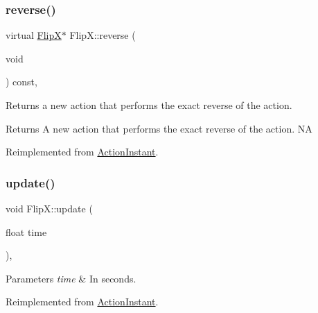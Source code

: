 \subsubsection{\texorpdfstring{reverse()}{reverse()}\hspace{0.1cm}{\footnotesize\ttfamily [2/2]}}
{\footnotesize\ttfamily virtual \hyperlink{classFlipX}{FlipX}$\ast$ Flip\+X\+::reverse (\begin{DoxyParamCaption}\item[{void}]{ }\end{DoxyParamCaption}) const\hspace{0.3cm}{\ttfamily [override]}, {\ttfamily [virtual]}}

Returns a new action that performs the exact reverse of the action.

\begin{DoxyReturn}{Returns}
A new action that performs the exact reverse of the action.  NA 
\end{DoxyReturn}


Reimplemented from \hyperlink{classActionInstant_aeb1870802c509e1f4111c863a28e9262}{Action\+Instant}.

\mbox{\label{classFlipX_ac83f96bee0cebd14b4d06813bd259047}} 
\subsubsection{\texorpdfstring{update()}{update()}\hspace{0.1cm}{\footnotesize\ttfamily [1/2]}}
{\footnotesize\ttfamily void Flip\+X\+::update (\begin{DoxyParamCaption}\item[{float}]{time }\end{DoxyParamCaption})\hspace{0.3cm}{\ttfamily [override]}, {\ttfamily [virtual]}}


\begin{DoxyParams}{Parameters}
{\em time} & In seconds. \\
\hline
\end{DoxyParams}


Reimplemented from \hyperlink{classActionInstant_a59875bf08cd1f58c0c8c6693ac540ade}{Action\+Instant}.

\mbox{\label{classFlipX_a7722cb20061b1e1708581585a1e2f1b3}} 
